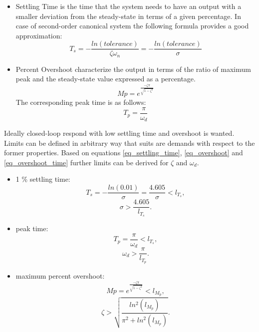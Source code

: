 \documentclass[12pt,english]{article}
\begin{document}
\begin{itemize}
	\item Settling Time is the time that the system needs to have an output with a smaller deviation from the steady-state in terms of a given percentage. In case of second-order canonical system the following formula provides a good approximation: \cite{dc_motor_3}
	\begin{equation}
	T_s = -\frac{ln(tolerance)}{\zeta \omega_n} = -\frac{ln(tolerance)}{\sigma}
	\label{eq_settling_time}
	\end{equation}
	\item Percent Overshoot characterize the output in terms of the ratio of maximum peak and the steady-state value expressed as a percentage. \cite{dc_motor_3}
	\begin{equation}
	Mp = e^{\frac{-\zeta \pi}{\sqrt{1-\zeta^2}}}
	\label{eq_overshoot}
	\end{equation}
	The corresponding peak time is as follows: \cite{dc_motor_3}
	\begin{equation}
	T_p = \frac{\pi}{\omega_d}
	\label{eq_overshoot_time}
	\end{equation}
\end{itemize}
Ideally closed-loop respond with low settling time and overshoot is wanted. Limits can be defined in arbitrary way that suits are demands with respect to the former properties. Based on equations \ref{eq_settling_time}, \ref{eq_overshoot} and \ref{eq_overshoot_time} further limits can be derived for $\zeta$ and $\omega_d$.
\begin{itemize}
	\item 1 \% settling time:
	\begin{equation}
	T_s = -\frac{ln(0.01)}{\sigma} = \frac{4.605}{\sigma} < l_{T_s},
	\end{equation}
	\begin{equation}
	\sigma > \frac{4.605}{l_{T_s}}.
	\end{equation}
	
	\item peak time:
	\begin{equation}
	T_p = \frac{\pi}{\omega_d} < l_{T_s},
	\end{equation}
	\begin{equation}
	\omega_d > \frac{\pi}{l_{T_p}}.
	\end{equation}
	
	\item maximum percent overshoot:
	\begin{equation}
	Mp = e^{\frac{-\zeta \pi}{\sqrt{1-\zeta^2}}}  < l_{M_p},
	\end{equation}
	\begin{equation}
	\zeta > \sqrt{\frac{ln^2(l_{M_p})}{\pi^2+ln^2(l_{M_p})}}.
	\end{equation}
\end{itemize}
\end{document}
